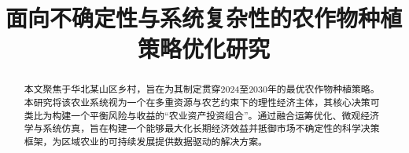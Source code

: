 \documentclass[withoutpreface,bwprint]{cumcmthesis} %
\title{面向不确定性与系统复杂性的农作物种植策略优化研究}
\begin{document}
\maketitle
\begin{abstract}

本文聚焦于华北某山区乡村，旨在为其制定贯穿2024至2030年的最优农作物种植策略。本研究将该农业系统视为一个在多重资源与农艺约束下的理性经济主体，其核心决策可类比为构建一个平衡风险与收益的“农业资产投资组合”。通过融合运筹优化、微观经济学与系统仿真，旨在构建一个能够最大化长期经济效益并抵御市场不确定性的科学决策框架，为区域农业的可持续发展提供数据驱动的解决方案。



\end{abstract}





















\newpage



\newpage
\end{document}
